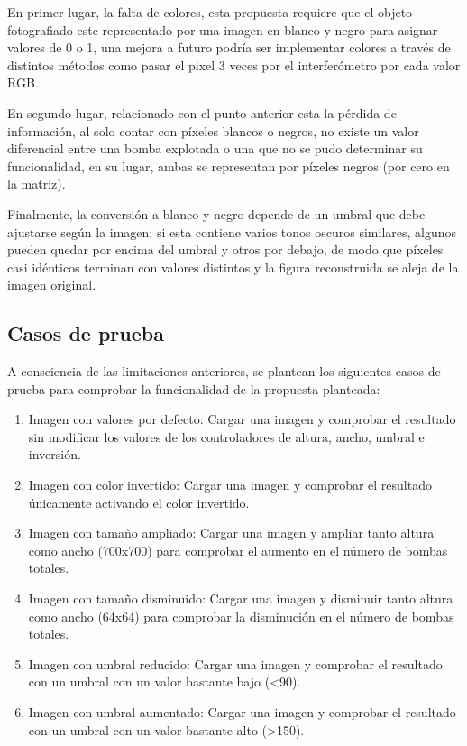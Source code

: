 \documentclass[conference]{IEEEtran}
\begin{document}
En primer lugar, la falta de colores, esta propuesta requiere que el objeto fotografiado este representado por una imagen en blanco y negro
para asignar valores de 0 o 1, una mejora a futuro podría ser implementar colores a través de distintos métodos como pasar el pixel 3 veces por el 
interferómetro por cada valor RGB. 

En segundo lugar, relacionado con el punto anterior esta la pérdida de información, al solo contar con píxeles blancos o negros, no existe un valor
diferencial entre una bomba explotada o una que no se pudo determinar su funcionalidad, en su lugar, ambas se representan por píxeles negros (por cero
en la matriz).

Finalmente, la conversión a blanco y negro depende de un umbral que debe ajustarse según la imagen: si esta contiene varios tonos oscuros similares, algunos pueden quedar 
por encima del umbral y otros por debajo, de modo que píxeles casi idénticos terminan con valores distintos y la figura reconstruida se aleja de la imagen original.

\subsection{Casos de prueba}
A consciencia de las limitaciones anteriores, se plantean los siguientes casos de prueba para comprobar la funcionalidad de la propuesta planteada:
\begin{enumerate}
    \item Imagen con valores por defecto: Cargar una imagen y comprobar el resultado sin modificar los valores de los controladores de altura, ancho, umbral e inversión.
    \item Imagen con color invertido: Cargar una imagen y comprobar el resultado únicamente activando el color invertido.
    \item Imagen con tamaño ampliado: Cargar una imagen y ampliar tanto altura como ancho (700x700) para comprobar el aumento en el número de bombas totales.
    \item Imagen con tamaño disminuido: Cargar una imagen y disminuir tanto altura como ancho (64x64) para comprobar la disminución en el número de bombas totales.
    \item Imagen con umbral reducido: Cargar una imagen y comprobar el resultado con un umbral con un valor bastante bajo (<90).
    \item Imagen con umbral aumentado: Cargar una imagen y comprobar el resultado con un umbral con un valor bastante alto (>150).
\end{enumerate}
\end{document}
